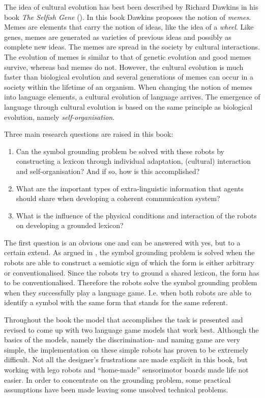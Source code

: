 The idea of cultural evolution has best been described by Richard Dawkins in his book {\em The Selfish Gene} (\citeyear{dawkins:1976}). In this book Dawkins proposes the notion of {\em memes}. Memes are elements that carry the notion of ideas, like the idea of a {\em wheel}. Like genes, memes are generated as varieties of previous ideas and possibly as complete new ideas. The memes are spread in the society by cultural interactions. The evolution of memes is similar to that of genetic evolution and good memes survive, whereas bad memes do not. However, the cultural evolution is much faster than biological evolution and several generations of memes can occur in a society within the lifetime of an organism. When changing the notion of memes into language elements, a cultural evolution of language arrives. The emergence of language through cultural evolution is based on the same principle as biological evolution, namely {\em self-organisation}.


Three main research questions are raised in this book:

\begin{enumerate}
\item Can the symbol grounding problem be solved with these robots by constructing a lexicon through individual adaptation, (cultural) interaction and self-organisation? And if so, how is this accomplished?
\item What are the important types of extra-linguistic information that agents should share when developing a coherent communication system?
\item What is the influence of the physical conditions and interaction of the robots on developing a grounded lexicon?
\end{enumerate}


The first question is an obvious one and can be answered with yes, but to a certain extend. As argued in , the symbol grounding problem is solved when the robots are able to construct a semiotic sign of which the form is either arbitrary or conventionalised. Since the robots try to ground a shared lexicon, the form has to be conventionalised. Therefore the robots solve the symbol grounding problem when they successfully play a language game. I.e. when both robots are able to identify a symbol with the same form that stands for the same referent. 

Throughout the book the model that accomplishes the task is presented and revised to come up with two language game models that work best. Although the basics of the models, namely the discrimination- and naming game are very simple, the implementation on these simple robots has proven to be extremely difficult. Not all the designer's frustrations are made explicit in this book, but working with {\sc lego} robots and ``home-made'' sensorimotor boards made life not easier. In order to concentrate on the grounding problem, some practical assumptions have been made leaving some unsolved technical problems. 

